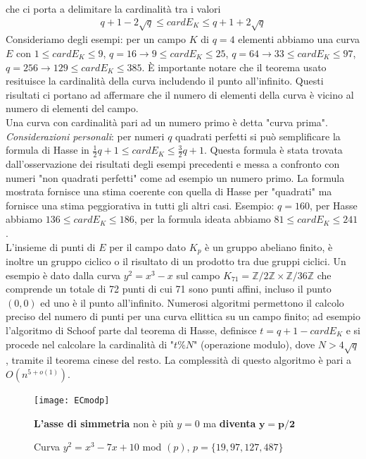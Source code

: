 \documentclass[a4paper,12pt]{tesiinfo}
\newcommand\ddfrac[2]{\frac{\displaystyle #1}{\displaystyle #2}}
\begin{document}
che ci porta a delimitare la cardinalit\`a tra i valori 
\begin{align*}
    q+1-2 \sqrt {q} \le cardE_K \le q+1+2 \sqrt {q}
\end{align*}
Consideriamo degli esempi: per un campo $K$ di $q=4$ elementi abbiamo una curva $E$ con $1 \le cardE_K \le 9$, $q=16 \to 9 \le cardE_K \le 25$, $q=64 \to 33 \le cardE_K \le 97$, $q=256 \to 129 \le cardE_K \le 385$. \`E importante notare che il teorema usato resituisce la cardinalit\`a della curva includendo il punto all'infinito.
Questi risultati ci portano ad affermare che il numero di elementi della curva \`e vicino al numero di elementi del campo. 
\\
Una curva con cardinalit\`a pari ad un numero primo \`e detta "curva prima".
\\
\textit{Considerazioni personali}: per numeri $q$ quadrati perfetti si pu\`o semplificare la formula di Hasse in $ \ddfrac{1}{2}q +1 \le cardE_K \le \ddfrac{3}{2}q +1$. Questa formula \`e stata trovata dall'osservazione dei risultati degli esempi precedenti e messa a confronto con numeri "non quadrati perfetti" come ad esempio un numero primo. La formula mostrata fornisce una stima coerente con quella di Hasse per "quadrati" ma fornisce una stima peggiorativa in tutti gli altri casi. Esempio: $q=160$, per Hasse abbiamo $136 \le cardE_K \le 186$, per la formula ideata abbiamo $81 \le cardE_K \le 241$. 
\\
L'insieme di punti di $E$ per il campo dato $K_p$ \`e un gruppo abeliano finito, \`e inoltre un gruppo ciclico o il risultato di un prodotto tra due gruppi ciclici. Un esempio \`e dato dalla curva $y^2 = x^3 - x$ sul campo $K_{71} = \mathbb{Z}/2\mathbb{Z}\times\mathbb{Z}/36\mathbb{Z}$ che comprende un totale di 72 punti di cui 71 sono punti affini, incluso il punto $(0,0)$ ed uno \`e il punto all'infinito.
Numerosi algoritmi permettono il calcolo preciso del numero di punti per una curva ellittica su un campo finito; ad esempio l'algoritmo di Schoof parte dal teorema di Hasse, definisce $t = q+1-cardE_K$ e si procede nel calcolare la cardinalit\`a di "$t\%N$" (operazione modulo), dove $N > 4\sqrt{q}$, tramite il teorema cinese del resto. La complessit\`a di questo algoritmo \`e pari a $O(n^{5+o(1)})$.
%
\begin{figure}[ht]
    \texttt{[image: ECmodp]}
    \caption{Curva $y^2 = x^3-7x+10$ mod $(p)$, $p = \{19, 97, 127, 487\}$}
\begin{center}
\textbf{L'asse di simmetria} non \`e pi\`u $y=0$ ma \textbf{diventa} $\mathbold{y=p\big / 2}$
\end{center}
\end{figure}
\end{document}
